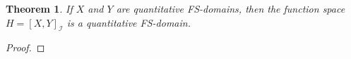\documentclass[preprint,3p,times]{elsarticle}
\newtheorem{theorem}{Theorem}[section]
\theoremstyle{definition}
\theoremstyle{remark}
\newcommand{\I}{\mathcal{I}}
\newcommand{\id}{\mathrm{id}}
\newcommand{\supop}{\operatorname{sup}}
\newcommand{\tn}{\mathbin{\&}}
\numberwithin{equation}{section}
\begin{document}
\begin{theorem}\label{thm:pointwise-hom-qfs}
If \(X\) and \(Y\) are quantitative FS-domains, then the function space
\(
  H=[X,Y]_{\I}
\)
is a quantitative FS-domain.
\end{theorem}

\begin{proof}



\end{proof}
\end{document}
